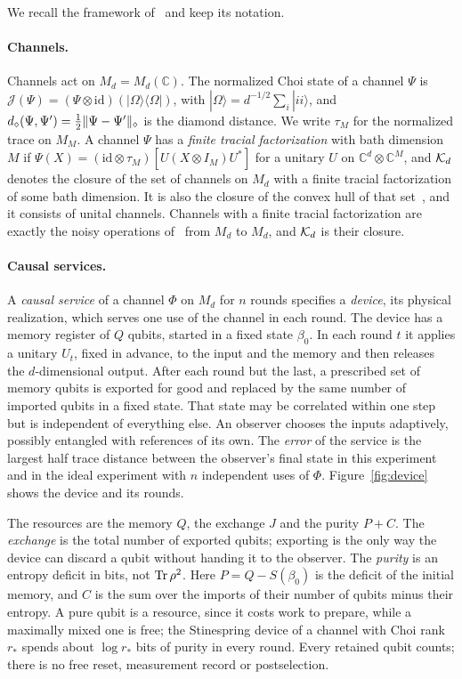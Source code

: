 We recall the framework of~\cite{DouglasMghirbiB} and keep its notation.

\paragraph{Channels.} Channels act on $M_d=M_d(\mathbb C)$. The normalized Choi state of a channel $\Psi$ is
$\mathcal J(\Psi)=(\Psi\otimes\mathrm{id})(|\Omega\rangle\langle\Omega|)$, with $|\Omega\rangle=d^{-1/2}\sum_i|ii\rangle$, and
$d_\diamond(\Psi,\Psi')=\frac12\|\Psi-\Psi'\|_\diamond$ is the diamond distance. We write $\tau_M$ for the normalized trace on $M_M$. A channel $\Psi$ has a
\emph{finite tracial factorization} with bath dimension $M$ if $\Psi(X)=(\mathrm{id}\otimes\tau_M)[U(X\otimes I_M)U^*]$ for a unitary $U$ on
$\mathbb C^d\otimes\mathbb C^M$, and $\mathcal K_d$ denotes the closure of the set of channels on $M_d$ with a finite tracial factorization of some bath
dimension. It is also the closure of the convex hull of that set~\cite[Proposition~3.8(ii)]{Musat2025}, and it consists of unital channels. Channels
with a finite tracial factorization are exactly the noisy operations of~\cite{HHO2003} from $M_d$ to $M_d$, and $\mathcal K_d$ is their closure.

\paragraph{Causal services.} A \emph{causal service} of a channel $\Phi$ on $M_d$ for $n$ rounds specifies a \emph{device}, its physical
realization, which serves one use of the channel in each round. The device has a memory register of $Q$ qubits, started in a fixed state
$\beta_0$. In each round $t$ it applies a unitary $U_t$, fixed in advance, to the input and the memory and then releases the $d$-dimensional output. After each round
but the last, a prescribed set of memory qubits is exported for good and replaced by the same number of imported qubits in a fixed state.
That state may be correlated within one step but is independent of everything else. An observer chooses the inputs adaptively, possibly
entangled with references of its own. The \emph{error} of the service is the largest half trace distance between the observer's final state in
this experiment and in the ideal experiment with $n$ independent uses of $\Phi$. Figure~\ref{fig:device} shows the device and its rounds.

The resources are the memory $Q$, the exchange $J$ and the purity $P+C$. The \emph{exchange} is the total number of exported qubits;
exporting is the only way the device can discard a qubit without handing it to the observer. The \emph{purity} is an entropy deficit in bits,
not $\operatorname{Tr}\rho^2$. Here $P=Q-S(\beta_0)$ is the deficit of the initial memory, and $C$ is the sum over the imports of their number of qubits
minus their entropy. A pure qubit is a resource, since it costs work to prepare, while a maximally mixed one is free; the Stinespring device
of a channel with Choi rank $r_*$ spends about $\log r_*$ bits of purity in every round. Every retained qubit counts; there is no free reset,
measurement record or postselection.

